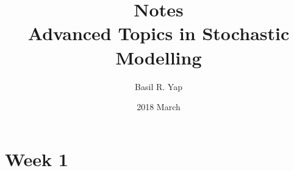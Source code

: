 \documentclass[a4paper, fleqn]{article}
\begin{document}
\title{Notes \\ Advanced Topics in Stochastic Modelling}
\author{Basil R. Yap}
\date{2018 March}
\maketitle

\section{Week 1}
\end{document}
